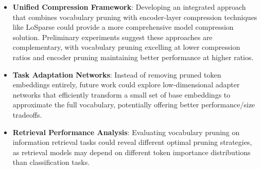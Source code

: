 \documentclass[twocolumn]{article}
\begin{document}
\begin{itemize}
    \item \textbf{Unified Compression Framework}: Developing an integrated approach that combines vocabulary pruning with encoder-layer compression techniques like LoSparse could provide a more comprehensive model compression solution. Preliminary experiments suggest these approaches are complementary, with vocabulary pruning excelling at lower compression ratios and encoder pruning maintaining better performance at higher ratios.
    
    \item \textbf{Task Adaptation Networks}: Instead of removing pruned token embeddings entirely, future work could explore low-dimensional adapter networks that efficiently transform a small set of base embeddings to approximate the full vocabulary, potentially offering better performance/size tradeoffs.
    
    \item \textbf{Retrieval Performance Analysis}: Evaluating vocabulary pruning on information retrieval tasks could reveal different optimal pruning strategies, as retrieval models may depend on different token importance distributions than classification tasks.

\end{itemize}
\newpage


\end{document}

